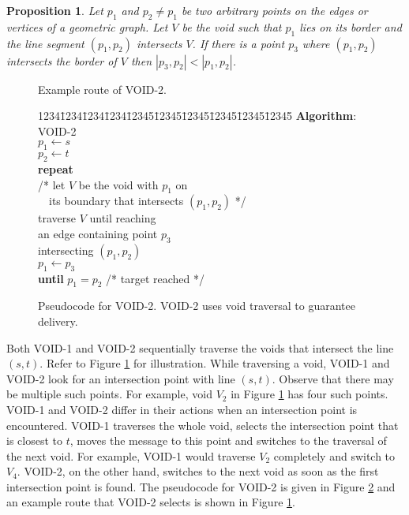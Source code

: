 \documentclass[conference]{IEEEtran}
\newtheorem{proposition}{Proposition}
\begin{document}
\begin{proposition}
Let $p_1$ and $p_2 \neq p_1$ be two arbitrary points on the edges or
vertices of a geometric graph. Let $V$ be the void such that $p_1$
lies on its border and the line segment $(p_1,p_2)$ intersects $V$. If
there is a point $p_3$ where $(p_1,p_2)$ intersects the border of $V$
then $|p_3,p_2| < |p_1,p_2|$.
\end{proposition}

\begin{figure}
\center {}
\caption{Example route of VOID-2.}
\label{FigVoid2Pic} 
\end{figure}



\begin{figure}[h]
\begin{tabbing}
1234\=1234\=1234\=1234\=12345\=12345\=12345\=12345\=12345\=12345\=\kill
\textbf{Algorithm}: VOID-2 \\
\>$p_1 \leftarrow s$ \\
\>$p_2 \leftarrow t$ \\
\>\textbf{repeat} \\
\>\>/* let $V$ be the void with $p_1$ on  \\
\>\> \ \  its boundary that intersects $(p_1,p_2)$ */\\
\>\>traverse $V$ until reaching      \\
\>\>an edge containing point $p_3$  \\
\>\>intersecting $(p_1,p_2)$ \\
\>\>$p_1 \leftarrow p_3$ \\
\>\textbf{until} $p_1=p_2$ /* target reached */ \\
\end{tabbing}
\caption{Pseudocode for VOID-2. VOID-2 uses void 
         traversal to guarantee delivery.}
\label{FigVoid2Alg}
\end{figure}


Both VOID-1 and VOID-2 sequentially traverse the voids that intersect
the line $(s,t)$. Refer to Figure \ref{FigVoid2Pic} for illustration.
While traversing a void, VOID-1 and VOID-2 look for an intersection
point with line $(s,t)$. Observe that there may be multiple such
points. For example, void $V_2$ in Figure \ref{FigVoid2Pic} has four
such points. VOID-1 and VOID-2 differ in their actions when an
intersection point is encountered. VOID-1 traverses the whole void,
selects the intersection point that is closest to $t$, moves the
message to this point and switches to the traversal of the next
void. For example, VOID-1 would traverse $V_2$ completely and switch
to $V_4$. VOID-2, on the other hand, switches to the next void as soon
as the first intersection point is found. The pseudocode for VOID-2 is
given in Figure \ref{FigVoid2Alg} and an example route that VOID-2
selects is shown in Figure \ref{FigVoid2Pic}.
\end{document}
